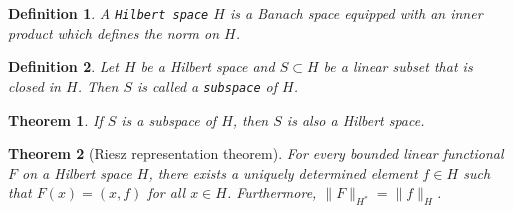 \documentclass[11pt]{article}
\newtheorem{theorem}{Theorem}
\newtheorem{definition}{Definition}
\theoremstyle{definition}
\begin{document}
\begin{definition}
	A \texttt{Hilbert space} $H$ is a Banach space equipped with an inner product which defines the norm on $H$.
\end{definition}

\begin{definition}
	Let $H$ be a Hilbert space and $S \subset H$ be a linear subset that is closed in $H$. Then $S$ is called a \texttt{subspace} of $H$.
\end{definition}

\begin{theorem}
	If $S$ is a subspace of $H$, then $S$ is also a Hilbert space.
\end{theorem}


\begin{theorem}[Riesz representation theorem]
	For every bounded linear functional $F$ on a Hilbert space $H$, there exists a uniquely determined element $f \in H$
	such that $F(x) = (x,f)$ for all $x \in H$. Furthermore, $\|F\|_{H^*} = \|f\|_H$.
\end{theorem}
\end{document}
